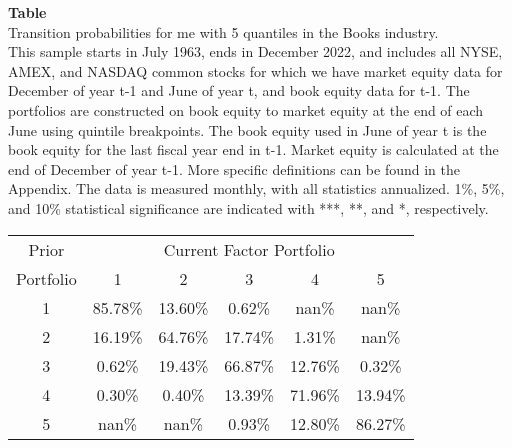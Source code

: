 \begin{table*}[ht!]
\raggedright
{}
\label{tab: transition_probs_me_Books_with_5_quantiles}
\textbf{Table \thetable} \\
Transition probabilities for me with 5 quantiles in the Books industry. \\
\hspace*{1em}This sample starts in July 1963, ends in December 2022, and includes all NYSE, AMEX, and NASDAQ common stocks for which we have market equity data for December of year t-1 and June of year t, and book equity data for t-1. The portfolios are constructed on book equity to market equity at the end of each June using quintile breakpoints.  The book equity used in June of year t is the book equity for the last fiscal year end in t-1.  Market equity is calculated at the end of December of year t-1.  More specific definitions can be found in the Appendix.  The data is measured monthly, with all statistics annualized.  1\%, 5\%, and 10\% statistical significance are indicated with ***, **, and *, respectively. \\
\vspace{0.5em}
\centering
\begin{adjustbox}{max width=\textwidth}
\begin{tabular}{@{}cccccc@{}}
\toprule
Prior & \multicolumn{5}{c}{Current Factor Portfolio} \\
Portfolio & 1 & 2 & 3 & 4 & 5 \\
\midrule
1 & 85.78\% & 13.60\% & 0.62\% & nan\% & nan\% \\
2 & 16.19\% & 64.76\% & 17.74\% & 1.31\% & nan\% \\
3 & 0.62\% & 19.43\% & 66.87\% & 12.76\% & 0.32\% \\
4 & 0.30\% & 0.40\% & 13.39\% & 71.96\% & 13.94\% \\
5 & nan\% & nan\% & 0.93\% & 12.80\% & 86.27\% \\
\bottomrule
\end{tabular}
\end{adjustbox}
\end{table*}